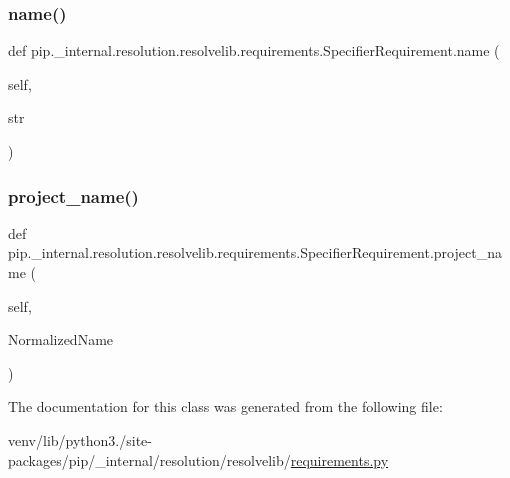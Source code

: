 \subsubsection{\texorpdfstring{name()}{name()}}
{\footnotesize\ttfamily def pip.\+\_\+internal.\+resolution.\+resolvelib.\+requirements.\+Specifier\+Requirement.\+name (\begin{DoxyParamCaption}\item[{}]{self,  }\item[{}]{str }\end{DoxyParamCaption})}

\mbox{\label{classpip_1_1__internal_1_1resolution_1_1resolvelib_1_1requirements_1_1SpecifierRequirement_a88acd8039ad23152b5a5c17016a2ebdf}} 
\subsubsection{\texorpdfstring{project\+\_\+name()}{project\_name()}}
{\footnotesize\ttfamily def pip.\+\_\+internal.\+resolution.\+resolvelib.\+requirements.\+Specifier\+Requirement.\+project\+\_\+name (\begin{DoxyParamCaption}\item[{}]{self,  }\item[{}]{Normalized\+Name }\end{DoxyParamCaption})}



The documentation for this class was generated from the following file\+:\begin{DoxyCompactItemize}
\item 
venv/lib/python3./site-\/packages/pip/\+\_\+internal/resolution/resolvelib/\hyperlink{pip_2__internal_2resolution_2resolvelib_2requirements_8py}{requirements.\+py}\end{DoxyCompactItemize}
